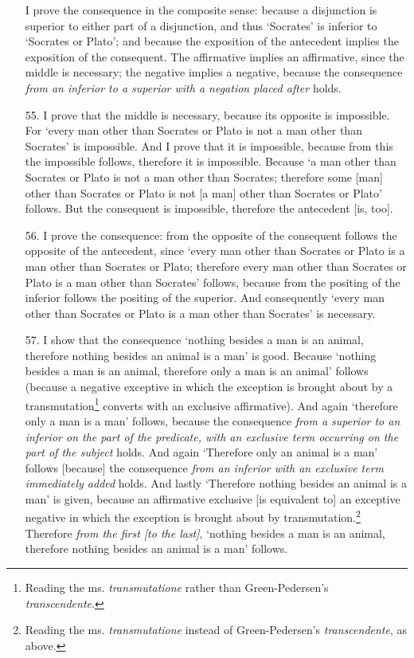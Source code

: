 \documentclass[]{article}
\begin{document}
\begin{enumerate}
I prove the consequence in the composite sense: because a disjunction is superior to either part of a disjunction, and thus `Socrates' is inferior to `Socrates or Plato'; and because the exposition of the antecedent implies the exposition of the consequent. The affirmative implies an affirmative, since the middle is necessary; the negative implies a negative, because the consequence \textit{from an inferior to a superior with a negation placed after} holds.
\item[55.] I prove that the middle is necessary, because its opposite is impossible. For `every man other than Socrates or Plato is not a man other than Socrates' is impossible. And I prove that it is impossible, because from this the impossible follows, therefore it is impossible. Because `a man other than Socrates or Plato is not a man other than Socrates; therefore some [man] other than Socrates or Plato is not [a man] other than Socrates or Plato' follows. But the consequent is impossible, therefore the antecedent [is, too].
\item[56.] I prove the consequence: from the opposite of the consequent follows the opposite of the antecedent, since `every man other than Socrates or Plato is a man other than Socrates or Plato; therefore every man other than Socrates or Plato is a man other than Socrates' follows, because from the positing of the inferior follows the positing of the superior. And consequently `every man other than Socrates or Plato is a man other than Socrates' is necessary.
\item[57.] I show that the consequence `nothing besides a man is an animal, therefore nothing besides an animal is a man' is good. Because `nothing besides a man is an animal, therefore only a man is an animal' follows (because a negative exceptive in which the exception is brought about by a transmutation\footnote{Reading the ms. \textit{transmutatione} rather than Green-Pedersen's \textit{transcendente}.} converts with an exclusive affirmative). And again `therefore only a man is a man' follows, because the consequence \textit{from a superior to an inferior on the part of the predicate, with an exclusive term occurring on the part of the subject} holds. And again `Therefore only an animal is a man' follows [because] the consequence \textit{from an inferior with an exclusive term immediately added} holds. And lastly `Therefore nothing besides an animal is a man' is given, because an affirmative exclusive [is equivalent to] an exceptive negative in which the exception is brought about by transmutation.\footnote{Reading the ms. \textit{transmutatione} instead of Green-Pedersen's \textit{transcendente}, as above.} Therefore \textit{from the first [to the last]}, `nothing besides a man is an animal, therefore nothing besides an animal is a man' follows.

\end{enumerate}
\end{document}
